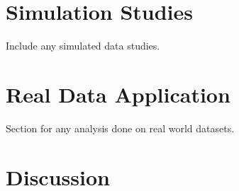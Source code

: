 \documentclass[12pt]{article}
\begin{document}
\section{Simulation Studies} \label{sec:simulation}

Include any simulated data studies.

\section{Real Data Application}\label{sec:realdata}

Section for any analysis done on real world datasets.

\section{Discussion}\label{sec:disc}




\clearpage


\end{document}
